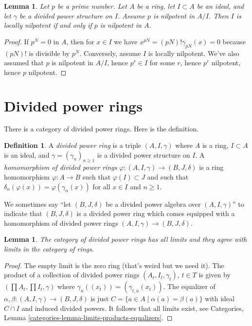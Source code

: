 \documentclass{stacks-project}
\theoremstyle{plain}
\newtheorem{lemma}[subsection]{Lemma}
\theoremstyle{definition}
\newtheorem{definition}[subsection]{Definition}
\theoremstyle{remark}
\numberwithin{equation}{subsection}
\begin{document}
\begin{lemma}
\label{lemma-nil}
Let $p$ be a prime number. Let $A$ be a ring, let $I \subset A$ be an ideal,
and let $\gamma$ be a divided power structure on $I$. Assume $p$ is nilpotent
in $A/I$. Then $I$ is locally nilpotent if and only if $p$ is nilpotent in $A$.
\end{lemma}

\begin{proof}
If $p^N = 0$ in $A$, then for $x \in I$ we have
$x^{pN} = (pN)!\gamma_{pN}(x) = 0$ because $(pN)!$ is
divisible by $p^N$. Conversely, assume $I$ is locally nilpotent.
We've also assumed that $p$ is nilpotent in $A/I$, hence
$p^r \in I$ for some $r$, hence $p^r$ nilpotent, hence $p$ nilpotent.
\end{proof}








\section{Divided power rings}
\label{section-divided-power-rings}

\noindent
There is a category of divided power rings.
Here is the definition.

\begin{definition}
\label{definition-divided-power-ring}
A {\it divided power ring} is a triple $(A, I, \gamma)$ where
$A$ is a ring, $I \subset A$ is an ideal, and $\gamma = (\gamma_n)_{n \geq 1}$
is a divided power structure on $I$.
A {\it homomorphism of divided power rings}
$\varphi : (A, I, \gamma) \to (B, J, \delta)$ is a ring homomorphism
$\varphi : A \to B$ such that $\varphi(I) \subset J$ and such that
$\delta_n(\varphi(x)) = \varphi(\gamma_n(x))$ for all $x \in I$ and
$n \geq 1$.
\end{definition}

\noindent
We sometimes say ``let $(B, J, \delta)$ be a divided power algebra over
$(A, I, \gamma)$'' to indicate that $(B, J, \delta)$ is a divided power ring
which comes equipped with a homomorphism of divided power rings
$(A, I, \gamma) \to (B, J, \delta)$.

\begin{lemma}
\label{lemma-limits}
The category of divided power rings has all limits and they agree with
limits in the category of rings.
\end{lemma}

\begin{proof}
The empty limit is the zero ring (that's weird but we need it).
The product of a collection of divided power rings $(A_t, I_t, \gamma_t)$,
$t \in T$ is given by $(\prod A_t, \prod I_t, \gamma)$ where
$\gamma_n((x_t)) = (\gamma_{t, n}(x_t))$.
The equalizer of $\alpha, \beta : (A, I, \gamma) \to (B, J, \delta)$
is just $C = \{a \in A \mid \alpha(a) = \beta(a)\}$ with ideal $C \cap I$
and induced divided powers. It follows that all limits exist, see
Categories, Lemma \ref{categories-lemma-limits-products-equalizers}.
\end{proof}
\end{document}
